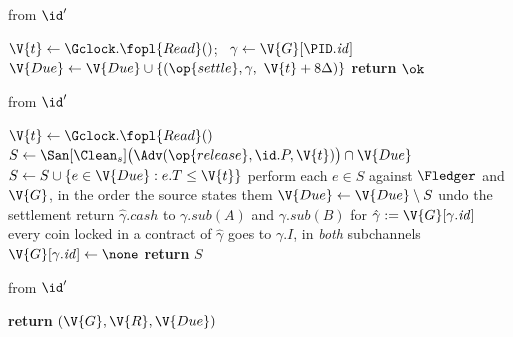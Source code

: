 \begin{interface}
{ \quad from $\id'$
\begin{algorithmic}[1]
\algcont
\State $\V{t} \gets \Gclock.\fopl{Read}()$; \ $\gamma \gets \V{G}[\PID.\mathit{id}]$
\State $\V{Due} \gets \V{Due} \cup \{(\op{settle}, \gamma, \ \V{t} + 8\Delta)\}$ \label{ln:chanclose}
\State \textbf{return} $\ok$
\algsave
\end{algorithmic}
\vspace{1.4ex}

 \quad from $\id'$
\begin{algorithmic}[1]
\algcont
\State $\V{t} \gets \Gclock.\fopl{Read}()$
\State $S \gets \San[\Clean_{s}]\bigl(\Adv(\op{release}, \id.P, \V{t})\bigr) \cap \V{Due}$ \label{ln:chanrelease}
\State $S \gets S \cup \{e \in \V{Due} : e.T \leq \V{t}\}$ \label{ln:chandeadline}
\State perform each $e \in S$ against $\Fledger$ and $\V{G}$, in the order the source states them
\State $\V{Due} \gets \V{Due} \setminus S$
 \label{ln:chanstuck}
  \State undo the settlement
\EndIf
{} \label{ln:chanvirtualclose}
  \State return $\hat{\gamma}.\mathit{cash}$ to $\gamma.\mathit{sub}(A)$ and $\gamma.\mathit{sub}(B)$ for $\hat{\gamma} := \V{G}[\gamma.\mathit{id}]$
  \State every coin locked in a contract of $\hat{\gamma}$ goes to $\gamma.I$, in \emph{both} subchannels \label{ln:chanIwhole}
  \State $\V{G}[\gamma.\mathit{id}] \gets \none$
\EndIf
\State \textbf{return} $S$
\algsave
\end{algorithmic}
\vspace{1.4ex}

 \quad from $\id'$
\begin{algorithmic}[1]
\algcont
\State \textbf{return} $(\V{G}, \V{R}, \V{Due})$ \label{ln:chanleak}
\algsave
\end{algorithmic}}
\end{interface}

